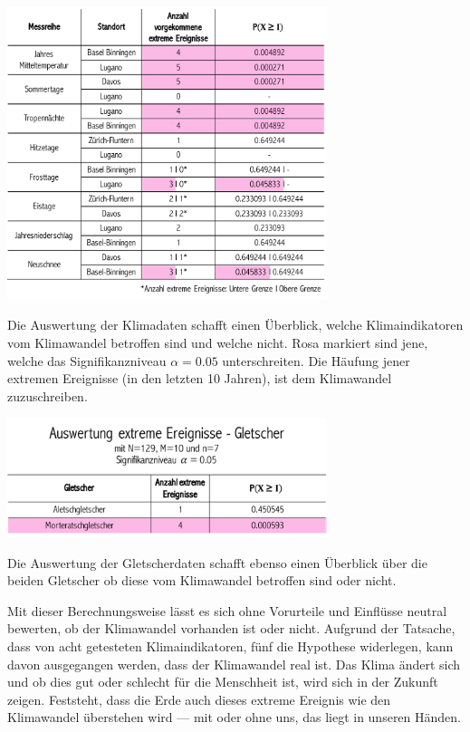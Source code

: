 \begin{refsection}
\begin{table}
\centering
\includegraphics[width=0.7\textwidth]{extrem/AuswertungK.pdf}
\caption{Die Auswertung der Klimadaten schafft einen Überblick, welche Klimaindikatoren vom Klimawandel betroffen sind und welche nicht. Rosa markiert sind jene, welche das Signifikanzniveau $\alpha=0.05$ unterschreiten. Die Häufung jener extremen Ereignisse (in den letzten 10 Jahren), ist dem Klimawandel zuzuschreiben.}
\label{AuswertungK}
\end{table}


\begin{table}
\centering
\includegraphics[width=0.7\textwidth]{extrem/AuswertungG.pdf}
\caption{Die Auswertung der Gletscherdaten schafft ebenso einen Überblick über die beiden Gletscher ob diese vom Klimawandel betroffen sind oder nicht.}
\label{AuswertungG}
\end{table}

Mit dieser Berechnungsweise lässt es sich ohne Vorurteile und Einflüsse neutral bewerten, ob der Klimawandel vorhanden ist oder nicht. Aufgrund der Tatsache, dass von acht getesteten Klimaindikatoren, fünf die Hypothese widerlegen, kann davon ausgegangen werden, dass der Klimawandel real ist. Das Klima ändert sich und ob dies gut oder schlecht für die Menschheit ist, wird sich in der Zukunft zeigen. Feststeht, dass die Erde auch dieses extreme Ereignis wie den Klimawandel überstehen wird --- mit oder ohne uns, das liegt in unseren Händen.



\end{refsection}
